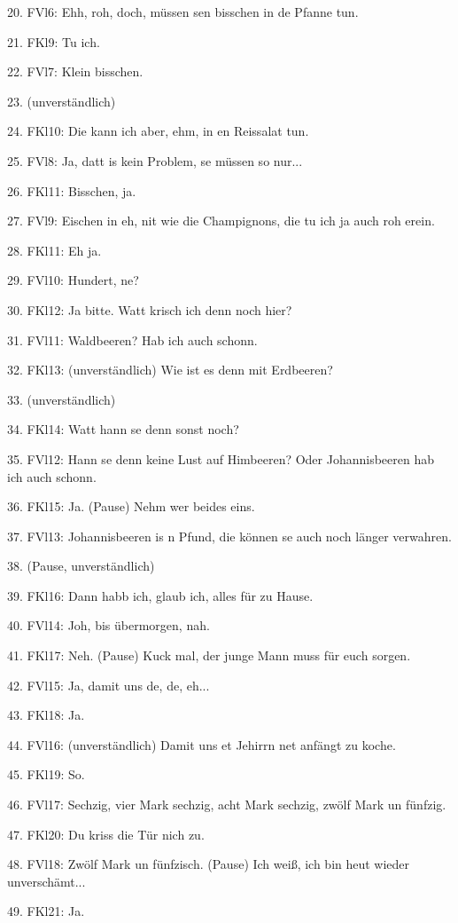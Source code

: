 \documentclass[
]{article}
\begin{document}
20. FVl6: Ehh, roh, doch, müssen se\textquotesingle n bisschen in de
Pfanne tun.

21. FKl9: Tu ich.

22. FVl7: Klein bisschen.

23. (unverständlich)

24. FKl10: Die kann ich aber, ehm, in en Reissalat tun.

25. FVl8: Ja, datt is kein Problem, se müssen so nur...

26. FKl11: Bisschen, ja.

27. FVl9: Eischen in eh, nit wie die Champignons, die tu ich ja auch roh
erein.

28. FKl11: Eh ja.

29. FVl10: Hundert, ne?

30. FKl12: Ja bitte. Watt krisch ich denn noch hier?

31. FVl11: Waldbeeren? Hab ich auch schonn.

32. FKl13: (unverständlich) Wie ist es denn mit Erdbeeren?

33. (unverständlich)

34. FKl14: Watt hann se denn sonst noch?

35. FVl12: Hann se denn keine Lust auf Himbeeren? Oder Johannisbeeren
hab ich auch schonn.

36. FKl15: Ja. (Pause) Nehm wer beides eins.

37. FVl13: Johannisbeeren is \textquotesingle n Pfund, die können se
auch noch länger verwahren.

38. (Pause, unverständlich)

39. FKl16: Dann habb ich, glaub ich, alles für zu Hause.

40. FVl14: Joh, bis übermorgen, nah.

41. FKl17: Neh. (Pause) Kuck mal, der junge Mann muss für euch sorgen.

42. FVl15: Ja, damit uns de, de, eh...

43. FKl18: Ja.

44. FVl16: (unverständlich) Damit uns et Jehirrn net anfängt zu koche.

45. FKl19: So.

46. FVl17: Sechzig, vier Mark sechzig, acht Mark sechzig, zwölf Mark un
fünfzig.

47. FKl20: Du kriss die Tür nich zu.

48. FVl18: Zwölf Mark un fünfzisch. (Pause) Ich weiß, ich bin heut
wieder unverschämt...

49. FKl21: Ja.
\end{document}
